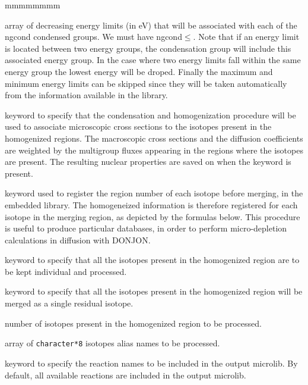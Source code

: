 \begin{ListeDeDescription}{mmmmmmmm}
\item[\dusa{energy}] array of decreasing energy limits (in eV) that will be
associated with each of the ngcond condensed groups. We must have ngcond$\le$. 
Note that if an energy limit is located between two energy groups, the condensation
group will include this associated energy group. In the case where two energy
limits fall within the same energy group the lowest energy will be droped.
Finally the maximum and minimum energy limits can be skipped since they will be
taken automatically from the information available in the library.

\item[\moc{MICR}] keyword to specify that the condensation and homogenization
procedure will be used to associate microscopic cross sections to the isotopes
present in the homogenized regions. The macroscopic cross sections and the
diffusion coefficients are weighted by the multigroup fluxes appearing in the
regions where the isotopes are present. The resulting nuclear properties are
saved on  when the  keyword is present.

\item[\moc{ALLX}] keyword used to register the region number of each isotope before merging, in the 
embedded library. The homogeneized information is therefore registered for each isotope in the merging
region, as depicted by the formulas below. This procedure is useful to produce particular databases, 
in order to perform micro-depletion calculations in diffusion with DONJON.

\item[\moc{ALL}] keyword to specify that all the isotopes present in the
homogenized region are to be kept individual and processed.

\item[\moc{RES}] keyword to specify that all the isotopes present in the
homogenized region will be merged as a single residual isotope.

\item[\dusa{nis}] number of isotopes present in the homogenized
region to be processed.

\item[\dusa{HISO}] array of {\tt character*8} isotopes alias names to be processed.

\item[\moc{REAC}] keyword to specify the reaction names to be included in the output microlib. By default, all available reactions
are included in the output microlib.


\end{ListeDeDescription}
